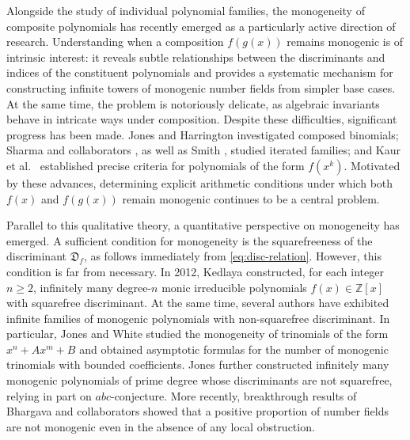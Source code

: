 \documentclass[table]{amsart}
\newcommand{\D}{\mathfrak{D}}
\numberwithin{equation}{section}
\begin{document}
Alongside the study of individual polynomial families, the monogeneity of composite polynomials has recently emerged as a particularly active direction of research. Understanding when a composition $f(g(x))$ remains monogenic is of intrinsic interest: it reveals subtle relationships between the discriminants and indices of the constituent polynomials and provides a systematic mechanism for constructing infinite towers of monogenic number fields from simpler base cases. At the same time, the problem is notoriously delicate, as algebraic invariants behave in intricate ways under composition. Despite these difficulties, significant progress has been made. Jones and Harrington \cite{JonesHarr} investigated composed binomials; Sharma and collaborators \cite{S-L-S}, as well as Smith \cite{hanson}, studied iterated families; and Kaur et al.\ \cite{KKR} established precise criteria for polynomials of the form $f(x^k)$. Motivated by these advances, determining explicit arithmetic conditions under which both $f(x)$ and $f(g(x))$ remain monogenic continues to be a central problem.


Parallel to this qualitative theory, a quantitative perspective on monogeneity has emerged.
A sufficient condition for monogeneity is the squarefreeness of the discriminant $\D_f$, as follows immediately from \eqref{eq:disc-relation}.
However, this condition is far from necessary.
In 2012, Kedlaya \cite{kedlaya} constructed, for each integer $n\ge 2$, infinitely many degree-$n$ monic irreducible polynomials $f(x)\in\mathbb{Z}[x]$ with squarefree discriminant.
At the same time, several authors have exhibited infinite families of monogenic polynomials with non-squarefree discriminant.
In particular, Jones and White \cite{L3} studied the monogeneity of trinomials of the form $x^n+Ax^m+B$ and obtained asymptotic formulas for the number of monogenic trinomials with bounded coefficients.
Jones \cite{L1} further constructed infinitely many monogenic polynomials of prime degree whose discriminants are not squarefree, relying in part on $abc$-conjecture.
More recently, breakthrough results of Bhargava and collaborators \cite{Manjulcubic, Manjulquartic} showed that a positive proportion of number fields are not monogenic even in the absence of any local obstruction.
\end{document}
